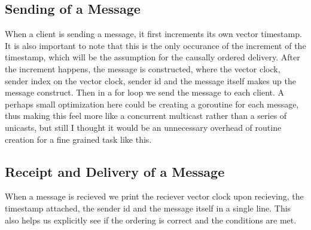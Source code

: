 \documentclass[11pt,reqno]{amsart}
\begin{document}
\subsection{Sending of a Message}
When a client is sending a message, it first increments its own vector timestamp. It is also important to note that this is the only occurance of the increment of the timestamp, which will be the assumption for the causally ordered delivery. After the increment happens, the message is constructed, where the vector clock, sender index on the vector clock, sender id and the message itself makes up the message construct. Then in a for loop we send the message to each client. A perhaps small optimization here could be creating a goroutine for each message, thus making this feel more like a concurrent multicast rather than a series of unicasts, but still I thought it would be an unnecessary overhead of routine creation for a fine grained task like this.

\subsection{Receipt and Delivery of a Message}
When a message is recieved we print the reciever vector clock upon recieving, the timestamp attached, the sender id and the message itself in a single line. This also helps us explicitly see if the ordering is correct and the conditions are met.
\end{document}
